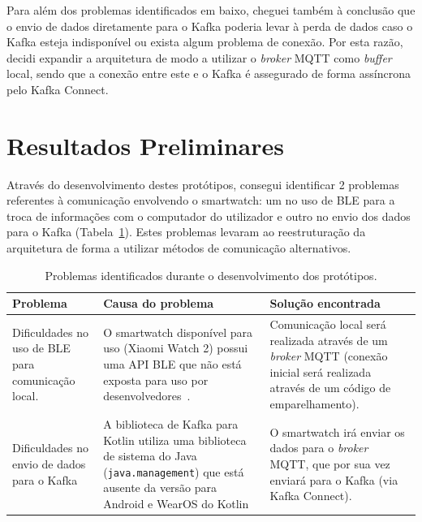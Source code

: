 Para além dos problemas identificados em baixo, cheguei também à conclusão que o envio de dados diretamente para o Kafka poderia levar à perda de dados caso o Kafka esteja indisponível ou exista algum problema de conexão. Por esta razão, decidi expandir a arquitetura de modo a utilizar o \textit{broker} \ac{MQTT} como \textit{buffer} local, sendo que a conexão entre este e o Kafka é assegurado de forma assíncrona pelo Kafka Connect.

\section{Resultados Preliminares}

Através do desenvolvimento destes protótipos, consegui identificar 2 problemas referentes à comunicação envolvendo o smartwatch: um no uso de \ac{BLE} para a troca de informações com o computador do utilizador e outro no envio dos dados para o Kafka (Tabela~\ref{tab:prob_identificados}). Estes problemas levaram ao reestruturação da arquitetura de forma a utilizar métodos de comunicação alternativos.

\begin{table}[H]
    \centering
    \caption{Problemas identificados durante o desenvolvimento dos protótipos.}
    \label{tab:prob_identificados}
    \begin{tabularx}{\textwidth}{X|X|X}
        \hline
        \textbf{Problema} & \textbf{Causa do problema} & \textbf{Solução encontrada} \\
        \hline
        Dificuldades no uso de \ac{BLE} para comunicação local. & O smartwatch disponível para uso (Xiaomi Watch 2) possui uma API \ac{BLE} que não está exposta para uso por desenvolvedores~\cite[p.~72, Fig.~26]{blexiaomi}. & Comunicação local será realizada através de um \textit{broker} \ac{MQTT} (conexão inicial será realizada através de um código de emparelhamento). \\
        \addlinespace[0.5em]
        Dificuldades no envio de dados para o Kafka & A biblioteca de Kafka para Kotlin utiliza uma biblioteca de sistema do Java (\texttt{java.management}) que está ausente da versão para Android e WearOS do Kotlin & O smartwatch irá enviar os dados para o \textit{broker} \ac{MQTT}, que por sua vez enviará para o Kafka (via Kafka Connect). \\
        \hline
    \end{tabularx}
\end{table}